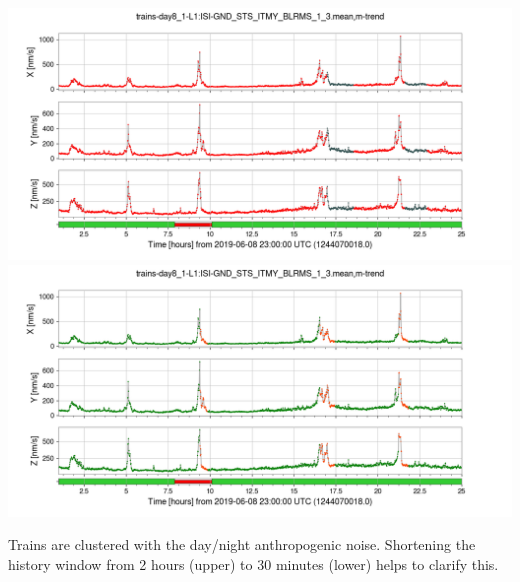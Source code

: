 \documentclass[colorlinks=true,pdfstartview=FitV,linkcolor=blue,
            citecolor=red,urlcolor=magenta]{ligodoc}
\begin{document}
\leftfigures
{
  \includegraphics[width=\textwidth]{assets/report1/trains-day8_1-L1:ISI-GND_STS_ITMY_BLRMS_1_3mean,m-trend.png}\\
  \includegraphics[width=\textwidth]{assets/report1/30m-trains-day8_1-L1:ISI-GND_STS_ITMY_BLRMS_1_3mean,m-trend.png}
}{
  \caption{Trains are clustered with the day/night anthropogenic noise. Shortening the history window from 2 hours (upper) to 30 minutes (lower)  helps to clarify this.}\label{fig:anth}
}
\end{document}
